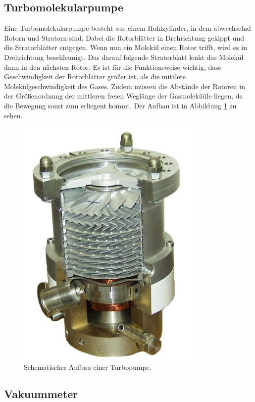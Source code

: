 \subsection{Turbomolekularpumpe}
Eine Turbomolekularpumpe besteht aus einem Hohlzylinder, in dem abwechselnd Rotorn und Stratorn sind. Dabei die Rotorblätter in Drehrichtung gekippt und die
Stratorblätter entgegen. Wenn nun ein Molekül einen Rotor trifft, wird es in Drehrichtung beschleunigt. Das darauf folgende Stratorblatt lenkt das Molekül dann
in den nächsten Rotor. Es ist für die Funktionsweise wichtig, dass Geschwindigkeit der Rotorblätter größer ist, als die mittlere Molekülgeschwindigkeit des
Gases. Zudem müssen die Abstände der Rotoren in der Größenordnung der mittleren freien Weglänge der Gasmoleküüle liegen, da die Bewegung sonst zum erliegent
kommt. Der Aufbau ist in Abbildung \ref{img:turbopump} zu sehen.
\begin{figure}
	\centering
	\includegraphics[width=0.8\textwidth]{img/turbopump.jpg}
	\caption{Schematischer Aufbau einer Turbopumpe.\cite{wiki}}
	\label{img:turbopump}
\end{figure}
\subsection{Vakuummeter}
